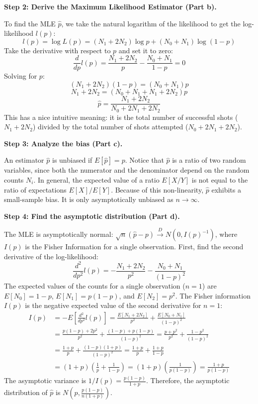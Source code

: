 \begin{solution}
\textbf{Step 2: Derive the Maximum Likelihood Estimator (Part b).}

To find the MLE $\hat{p}$, we take the natural logarithm of the likelihood to get the log-likelihood $l(p)$:
\[ l(p) = \log L(p) = (N_1 + 2N_2)\log p + (N_0 + N_1)\log(1-p) \]
Take the derivative with respect to $p$ and set it to zero:
\[ \frac{d}{dp} l(p) = \frac{N_1 + 2N_2}{p} - \frac{N_0 + N_1}{1-p} = 0 \]
Solving for $p$:
\[ (N_1 + 2N_2)(1-p) = (N_0 + N_1)p \]
\[ N_1 + 2N_2 = (N_0 + N_1 + N_1 + 2N_2)p \]
\[ \hat{p} = \frac{N_1 + 2N_2}{N_0 + 2N_1 + 2N_2} \]
This has a nice intuitive meaning: it is the total number of successful shots ($N_1 + 2N_2$) divided by the total number of shots attempted ($N_0 + 2N_1 + 2N_2$).

\textbf{Step 3: Analyze the bias (Part c).}

An estimator $\hat{p}$ is unbiased if $E[\hat{p}] = p$. Notice that $\hat{p}$ is a ratio of two random variables, since both the numerator and the denominator depend on the random counts $N_i$. In general, the expected value of a ratio $E[X/Y]$ is not equal to the ratio of expectations $E[X]/E[Y]$. Because of this non-linearity, $\hat{p}$ exhibits a small-sample bias. It is only asymptotically unbiased as $n \to \infty$.

\textbf{Step 4: Find the asymptotic distribution (Part d).}

The MLE is asymptotically normal: $\sqrt{n}(\hat{p} - p) \xrightarrow{D} N(0, I(p)^{-1})$, where $I(p)$ is the Fisher Information for a single observation.
First, find the second derivative of the log-likelihood:
\[ \frac{d^2}{dp^2} l(p) = -\frac{N_1 + 2N_2}{p^2} - \frac{N_0 + N_1}{(1-p)^2} \]
The expected values of the counts for a single observation ($n=1$) are $E[N_0] = 1-p$, $E[N_1] = p(1-p)$, and $E[N_2] = p^2$.
The Fisher information $I(p)$ is the negative expected value of the second derivative for $n=1$:
\begin{align*}
I(p) &= -E\left[ \frac{d^2}{dp^2} l(p) \right] = \frac{E[N_1 + 2N_2]}{p^2} + \frac{E[N_0 + N_1]}{(1-p)^2} \\
&= \frac{p(1-p) + 2p^2}{p^2} + \frac{(1-p) + p(1-p)}{(1-p)^2} = \frac{p+p^2}{p^2} + \frac{1-p^2}{(1-p)^2} \\
&= \frac{1+p}{p} + \frac{(1-p)(1+p)}{(1-p)^2} = \frac{1+p}{p} + \frac{1+p}{1-p} \\
&= (1+p) \left( \frac{1}{p} + \frac{1}{1-p} \right) = (1+p) \left( \frac{1}{p(1-p)} \right) = \frac{1+p}{p(1-p)}
\end{align*}
The asymptotic variance is $1/I(p) = \frac{p(1-p)}{1+p}$.
Therefore, the asymptotic distribution of $\hat{p}$ is $N\left(p, \frac{p(1-p)}{n(1+p)}\right)$.
\end{solution}

